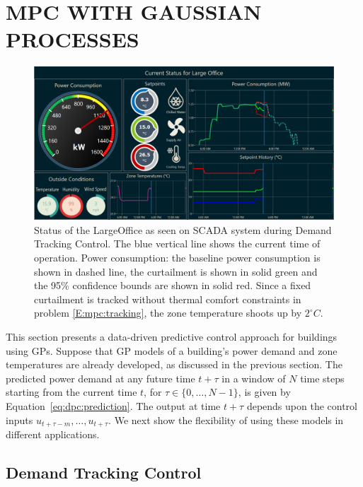 \section{MPC WITH GAUSSIAN PROCESSES}
\label{S:dpc}

\begin{figure}[t]
	\centering
	\includegraphics[width=0.9\linewidth]{images/Dashboard-PowerTrack.png}
	\caption{Status of the LargeOffice as seen on SCADA system during Demand Tracking Control. The blue vertical line shows the current time of operation. Power consumption: the baseline power consumption is shown in dashed line, the curtailment is shown in solid green and the 95\% confidence bounds are shown in solid red. Since a fixed curtailment is tracked without thermal comfort constraints in problem \eqref{E:mpc:tracking}, the zone temperature shoots up by \(2^\circ C\).}
	\label{F:tracking}
\end{figure}


This section presents a data-driven predictive control approach for buildings using GPs.
Suppose that GP models of a building's power demand and zone temperatures are already developed, as discussed in the previous section.
The predicted power demand at any future time $t+\tau$ in a window of $N$ time steps starting from the current time $t$, for \(\tau \in \{0,\dots,N-1\}\), is given by Equation~\eqref{eq:dpc:prediction}.
The output at time \(t+\tau\) depends upon %
the control inputs \(u_{t+\tau-m}, \dots, u_{t+\tau}\).
We next show the flexibility of using these models in different applications.

\subsection{Demand Tracking Control}

